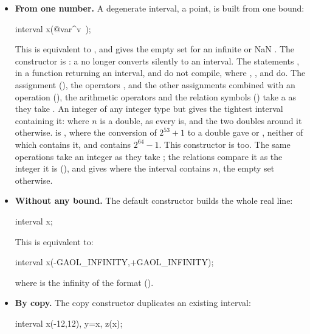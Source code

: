 \documentclass[12pt,a4paper,twoside,openright]{book}
\begin{document}
\begin{itemize}
\item[$\bullet$] \textbf{From one number.} A degenerate interval, a point, is
  built from one bound:
  \begin{example}
    interval x(@var^v~);
  \end{example}
  This is equivalent to , and gives the
  empty set for an infinite or NaN . The constructor is
  : a  no longer converts silently to an
  interval. The statements ,  in a
  function returning an interval,  and  do
  not compile, where , ,
   and  do. The
  assignment (), the operators \code{\&=}, \code{|=}
  and the other assignments combined with an operation
  (), the arithmetic operators and the
  relation symbols () take a  as
  they take .\newinvfive{} An integer  of any
  integer type but  gives the tightest interval containing it:
   where $n$ is a double, as every  is, and the two
  doubles around it otherwise.  is
  , where the conversion of $2^{53}+1$ to a double gave
   or , neither of which contains
  it, and  contains $2^{64}-1$. This constructor
  is  too. The same operations take an integer as they take
  ; the relations compare it as the integer it is
  (), and \code{\&=} gives
   where the interval contains $n$, the empty set
  otherwise.\newinvfive

\item[$\bullet$] \textbf{Without any bound.} The default constructor builds
  the whole real line:
  \begin{example}
    interval x;
  \end{example}
  This is equivalent to:
  \begin{example}
    interval x(-GAOL_INFINITY,+GAOL_INFINITY);
  \end{example}
  \noindent where  is the infinity of the 
  format ().

\item[$\bullet$] \textbf{By copy.} The copy constructor duplicates an
  existing interval:
  \begin{example}
    interval x(-12,12), y=x, z(x);
  \end{example}
\end{itemize}
\end{document}
